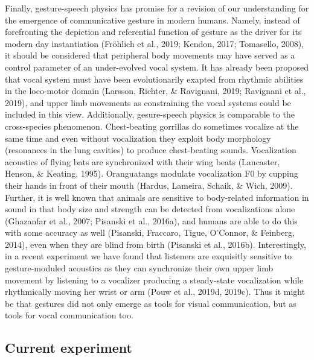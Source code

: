 \documentclass[
  man, noextraspace,floatsintext]{apa6}
\begin{document}
Finally, gesture-speech physics has promise for a revision of our understanding for the emergence of communicative gesture in modern humans. Namely, instead of forefronting the depiction and referential function of gesture as the driver for its modern day instantiation (Fröhlich et al., 2019; Kendon, 2017; Tomasello, 2008), it should be considered that peripheral body movements may have served as a control parameter of an under-evolved vocal system. It has already been proposed that vocal system must have been evolutionarily exapted from rhythmic abilities in the loco-motor domain (Larsson, Richter, \& Ravignani, 2019; Ravignani et al., 2019), and upper limb movements as constraining the vocal systems could be included in this view. Additionally, gesure-speech physics is comparable to the cross-species phenomenon. Chest-beating gorrillas do sometimes vocalize at the same time and even without vocalization they exploit body morphology (resonances in the lung cavities) to produce chest-beating sounds. Vocalization acoustics of flying bats are synchronized with their wing beats (Lancaster, Henson, \& Keating, 1995). Oranguatangs modulate vocalization F0 by cupping their hands in front of their mouth (Hardus, Lameira, Schaik, \& Wich, 2009). Further, it is well known that animals are sensitive to body-related information in sound in that body size and strength can be detected from vocalizations alone (Ghazanfar et al., 2007; Pisanski et al., 2016a), and humans are able to do this with some accuracy as well (Pisanski, Fraccaro, Tigue, O'Connor, \& Feinberg, 2014), even when they are blind from birth (Pisanski et al., 2016b). Interestingly, in a recent experiment we have found that listeners are exquisitly sensitive to gesture-moduled acoustics as they can synchronize their own upper limb movement by listening to a vocalizer producing a steady-state vocalization while rhythmically moving her wrist or arm (Pouw et al., 2019d, 2019c). Thus it might be that gestures did not only emerge as tools for visual communication, but as tools for vocal communication too.

\hypertarget{current-experiment}{%
\subsection{Current experiment}\label{current-experiment}}
\end{document}
